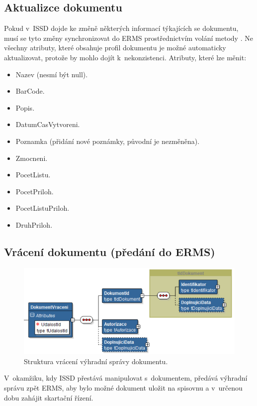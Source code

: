 \documentclass[
  master,
  field=ainfp,
  biblatex,
  language=czech,
  glossaries,
  theorems=false,
  index
]{kidiplom}
\begin{document}
\subsection{Aktualizce dokumentu}
Pokud v~ISSD dojde ke změně některých informací týkajících se dokumentu, musí se tyto změny synchronizovat do ERMS prostřednictvím volání metody . Ne všechny atributy, které obsahuje profil dokumentu je možné automaticky aktualizovat, protože by mohlo dojít k~nekonzistenci.
Atributy, které lze měnit:
\begin{itemize}
	\item Nazev (nesmí být null).
	\item BarCode.
	\item Popis.
	\item DatumCasVytvoreni.
	\item Poznamka (přidání nové poznámky, původní je nezměněna).
	\item Zmocneni.
	\item PocetListu.
	\item PocetPriloh.
	\item PocetListuPriloh.
	\item DruhPriloh.
\end{itemize}

\subsection{Vrácení dokumentu (předání do ERMS)}  
\begin{figure}[h]
  \centerline{\includegraphics[width=0.9\linewidth]{./images/DokumentVraceni.png}} 
  \caption{Struktura vrácení výhradní správy dokumentu.} 
\end{figure}  
V~okamžiku, kdy ISSD přestává manipulovat s~dokumentem, předává výhradní správu zpět ERMS, aby bylo možné dokument uložit na spisovnu a v~určenou dobu zahájit skartační řízení.
\end{document}
